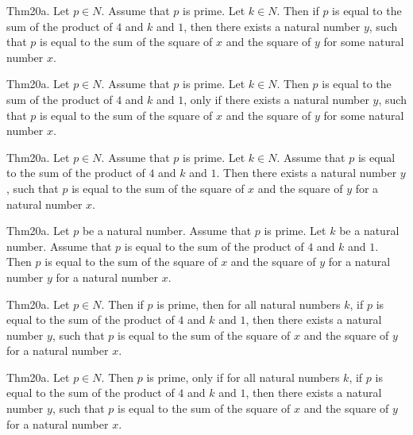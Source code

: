 \documentclass{article}
\begin{document}
Thm20a. Let $p \in N$. Assume that $p$ is prime. Let $k \in N$. Then if $p$ is equal to the sum of the product of $4$ and $k$ and $1$, then there exists a natural number $y$, such that $p$ is equal to the sum of the square of $x$ and the square of $y$ for some natural number $x$.

Thm20a. Let $p \in N$. Assume that $p$ is prime. Let $k \in N$. Then $p$ is equal to the sum of the product of $4$ and $k$ and $1$, only if there exists a natural number $y$, such that $p$ is equal to the sum of the square of $x$ and the square of $y$ for some natural number $x$.

Thm20a. Let $p \in N$. Assume that $p$ is prime. Let $k \in N$. Assume that $p$ is equal to the sum of the product of $4$ and $k$ and $1$. Then there exists a natural number $y$, such that $p$ is equal to the sum of the square of $x$ and the square of $y$ for a natural number $x$.

Thm20a. Let $p$ be a natural number. Assume that $p$ is prime. Let $k$ be a natural number. Assume that $p$ is equal to the sum of the product of $4$ and $k$ and $1$. Then $p$ is equal to the sum of the square of $x$ and the square of $y$ for a natural number $y$ for a natural number $x$.

Thm20a. Let $p \in N$. Then if $p$ is prime, then for all natural numbers $k$, if $p$ is equal to the sum of the product of $4$ and $k$ and $1$, then there exists a natural number $y$, such that $p$ is equal to the sum of the square of $x$ and the square of $y$ for a natural number $x$.

Thm20a. Let $p \in N$. Then $p$ is prime, only if for all natural numbers $k$, if $p$ is equal to the sum of the product of $4$ and $k$ and $1$, then there exists a natural number $y$, such that $p$ is equal to the sum of the square of $x$ and the square of $y$ for a natural number $x$.
\end{document}
